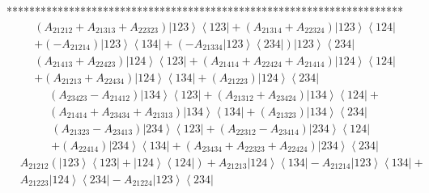 \documentclass[aps,preprint]{revtex4}%
\begin{document}
**********************************************************************%
\begin{align}
& \left(  A_{21212}+A_{21313}+A_{22323}\right)  \left\vert 123\right\rangle
\left\langle 123\right\vert +\left(  A_{21314}+A_{22324}\right)  \left\vert
123\right\rangle \left\langle 124\right\vert \\
& +\left(  -A_{21214}\right)  \left\vert 123\right\rangle \left\langle
134\right\vert +\left(  -A_{21334}\left\vert 123\right\rangle \left\langle
234\right\vert \right)  \left\vert 123\right\rangle \left\langle
234\right\vert
\end{align}%
\begin{align}
& \left(  A_{21413}+A_{22423}\right)  \left\vert 124\right\rangle \left\langle
123\right\vert +\left(  A_{21414}+A_{22424}+A_{21414}\right)  \left\vert
124\right\rangle \left\langle 124\right\vert \\
& +\left(  A_{21213}+A_{22434}\right)  \left\vert 124\right\rangle
\left\langle 134\right\vert +\left(  A_{21223}\right)  \left\vert
124\right\rangle \left\langle 234\right\vert
\end{align}%
\begin{align}
& \left(  A_{23423}-A_{21412}\right)  \left\vert 134\right\rangle \left\langle
123\right\vert +\left(  A_{21312}+A_{23424}\right)  \left\vert
134\right\rangle \left\langle 124\right\vert +\\
& \left(  A_{21414}+A_{23434}+A_{21313}\right)  \left\vert 134\right\rangle
\left\langle 134\right\vert +\left(  A_{21323}\right)  \left\vert
134\right\rangle \left\langle 234\right\vert
\end{align}%
\begin{align}
& \left(  A_{21323}-A_{23413}\right)  \left\vert 234\right\rangle \left\langle
123\right\vert +\left(  A_{22312}-A_{23414}\right)  \left\vert
234\right\rangle \left\langle 124\right\vert \\
& +\left(  A_{22414}\right)  \left\vert 234\right\rangle \left\langle
134\right\vert +\left(  A_{23434}+A_{22323}+A_{22424}\right)  \left\vert
234\right\rangle \left\langle 234\right\vert
\end{align}%
\begin{align}
& A_{21212}\left(  \left\vert 123\right\rangle \left\langle 123\right\vert
+\left\vert 124\right\rangle \left\langle 124\right\vert \right)
+A_{21213}\left\vert 124\right\rangle \left\langle 134\right\vert
-A_{21214}\left\vert 123\right\rangle \left\langle 134\right\vert +\\
& A_{21223}\left\vert 124\right\rangle \left\langle 234\right\vert
-A_{21224}\left\vert 123\right\rangle \left\langle 234\right\vert
\end{align}%
\end{document}
